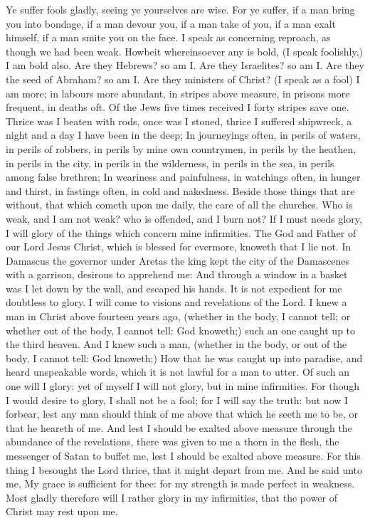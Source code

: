  Ye suffer fools gladly, seeing ye yourselves are wise. For ye suffer, if a man bring you into bondage, if a man devour you, if a man take of you, if a man exalt himself, if a man smite you on the face. I speak as concerning reproach, as though we had been weak. Howbeit whereinsoever any is bold, (I speak foolishly,) I am bold also. Are they Hebrews? so am I. Are they Israelites? so am I. Are they the seed of Abraham? so am I. Are they ministers of Christ? (I speak as a fool) I am more; in labours more abundant, in stripes above measure, in prisons more frequent, in deaths oft. Of the Jews five times received I forty stripes save one. Thrice was I beaten with rods, once was I stoned, thrice I suffered shipwreck, a night and a day I have been in the deep; In journeyings often, in perils of waters, in perils of robbers, in perils by mine own countrymen, in perils by the heathen, in perils in the city, in perils in the wilderness, in perils in the sea, in perils among false brethren; In weariness and painfulness, in watchings often, in hunger and thirst, in fastings often, in cold and nakedness. Beside those things that are without, that which cometh upon me daily, the care of all the churches. Who is weak, and I am not weak? who is offended, and I burn not? If I must needs glory, I will glory of the things which concern mine infirmities. The God and Father of our Lord Jesus Christ, which is blessed for evermore, knoweth that I lie not. In Damascus the governor under Aretas the king kept the city of the Damascenes with a garrison, desirous to apprehend me: And through a window in a basket was I let down by the wall, and escaped his hands. It is not expedient for me doubtless to glory. I will come to visions and revelations of the Lord. I knew a man in Christ above fourteen years ago, (whether in the body, I cannot tell; or whether out of the body, I cannot tell: God knoweth;) such an one caught up to the third heaven. And I knew such a man, (whether in the body, or out of the body, I cannot tell: God knoweth;) How that he was caught up into paradise, and heard unspeakable words, which it is not lawful for a man to utter. Of such an one will I glory: yet of myself I will not glory, but in mine infirmities. For though I would desire to glory, I shall not be a fool; for I will say the truth: but now I forbear, lest any man should think of me above that which he seeth me to be, or that he heareth of me. And lest I should be exalted above measure through the abundance of the revelations, there was given to me a thorn in the flesh, the messenger of Satan to buffet me, lest I should be exalted above measure. For this thing I besought the Lord thrice, that it might depart from me. And he said unto me, My grace is sufficient for thee: for my strength is made perfect in weakness. Most gladly therefore will I rather glory in my infirmities, that the power of Christ may rest upon me.


